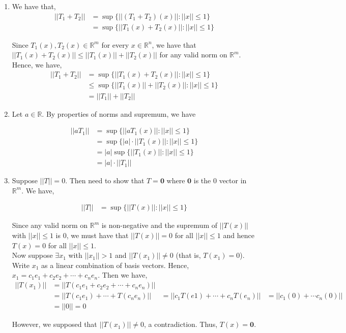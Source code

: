 \documentclass[12pt]{article}
\begin{document}
\begin{enumerate}

\item We have that,
\begin{align*}
||T_1 + T_2|| &= \sup \{||(T_1 + T_2)(x)||: ||x|| \leq 1 \}\\
&= \sup \{||T_1(x) + T_2(x)||: ||x|| \leq 1 \}
\end{align*}

Since $T_1(x), T_2(x) \in \mathbb{R}^m$ for every $x \in \mathbb{R}^n$, we have that $||T_1(x) + T_2(x)|| \leq ||T_1(x)|| + ||T_2(x)||$ for any valid norm on $\mathbb{R}^m$. Hence, we have,
\begin{align*}
||T_1 + T_2|| &= \sup \{||T_1(x) + T_2(x)||: ||x|| \leq 1 \}\\
&\leq \sup \{||T_1(x)|| + ||T_2(x)||: ||x|| \leq 1 \}\\
&= ||T_1|| + ||T_2||
\end{align*}

\item Let $a \in \mathbb{R}$. By properties of norms and supremum, we have

\begin{align*}
||aT_1|| &= \sup \{||aT_1(x)||: ||x|| \leq 1 \}\\
&= \sup \{|a| \cdot ||T_1(x)||: ||x|| \leq 1 \}\\
&= |a| \sup \{||T_1(x)||: ||x|| \leq 1 \}\\
&= |a| \cdot ||T_1||
\end{align*}

\item Suppose $||T|| = 0$. Then need to show that $T = \boldsymbol{0}$ where $\boldsymbol{0}$ is the $0$ vector in $\mathbb{R}^m$. We have,

\begin{align*}
||T|| &= \sup \{||T(x)||: ||x|| \leq 1\}
\end{align*}

Since any valid norm on $\mathbb{R}^m$ is non-negative and the supremum of $||T(x)||$ with $||x|| \leq 1$ is $0$, we must have that $||T(x)|| = 0$ for all $||x|| \leq 1$ and hence $T(x) = 0$ for all $||x|| \leq 1$.\\

Now suppose $\exists x_1$ with $||x_1|| > 1$ and $||T(x_1)|| \neq 0$ (that is, $T(x_1) = 0$).\\

Write $x_1$ as a linear combination of basis vectors. Hence, $x_1 = c_1e_1 + c_2e_2 + \cdots + c_ne_n$. Then we have,
\begin{align*}
||T(x_1)|| &= ||T(c_1e_1 + c_2e_2 + \cdots + c_ne_n)||\\
&= ||T(c_1e_1) + \cdots + T(c_ne_n)||
&= ||c_1T(e1) + \cdots + c_nT(e_n)||
&= ||c_1(0) + \cdots c_n(0)||\\
&= ||0|| = 0
\end{align*}

However, we supposed that $||T(x_1)|| \neq 0$, a contradiction. Thus, $T(x) = \boldsymbol{0}$.
\end{enumerate}
\end{document}
